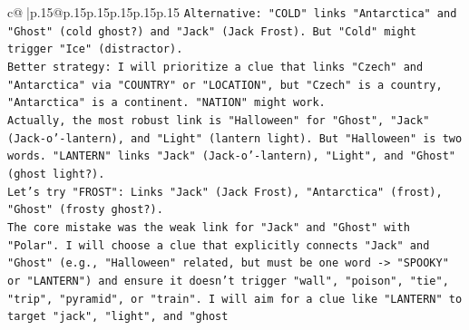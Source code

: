 \documentclass{article}
\begin{document}
{\begin{supertabular}{c@{$\;$}|p{.15\linewidth}@{}p{.15\linewidth}p{.15\linewidth}p{.15\linewidth}p{.15\linewidth}p{.15\linewidth}}
{{{\texttt{Alternative: "COLD" links "Antarctica" and "Ghost" (cold ghost?) and "Jack" (Jack Frost). But "Cold" might trigger "Ice" (distractor).} \\
\texttt{Better strategy: I will prioritize a clue that links "Czech" and "Antarctica" via "COUNTRY" or "LOCATION", but "Czech" is a country, "Antarctica" is a continent. "NATION" might work.} \\
\texttt{Actually, the most robust link is "Halloween" for "Ghost", "Jack" (Jack{-}o'{-}lantern), and "Light" (lantern light). But "Halloween" is two words. "LANTERN" links "Jack" (Jack{-}o'{-}lantern), "Light", and "Ghost" (ghost light?).} \\
\texttt{Let's try "FROST": Links "Jack" (Jack Frost), "Antarctica" (frost), "Ghost" (frosty ghost?).} \\
\texttt{The core mistake was the weak link for "Jack" and "Ghost" with "Polar". I will choose a clue that explicitly connects "Jack" and "Ghost" (e.g., "Halloween" related, but must be one word {-}> "SPOOKY" or "LANTERN") and ensure it doesn't trigger "wall", "poison", "tie", "trip", "pyramid", or "train". I will aim for a clue like "LANTERN" to target "jack", "light", and "ghost} \\
\\ 
}}}
\end{supertabular}}
\end{document}
